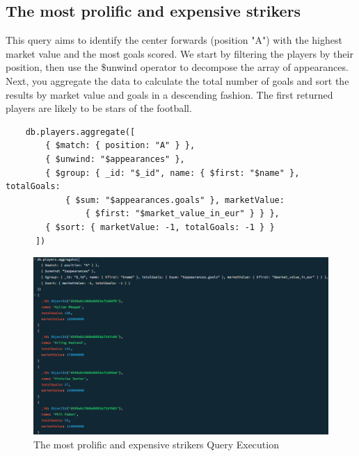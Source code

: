 \documentclass{Configuration_Files/PoliMi3i_thesis}
\begin{document}
\subsection{The most prolific and expensive strikers}
This query aims to identify the center forwards (position "A") with the highest market value and the most goals scored. We start by filtering the players by their position, then use the \$unwind operator to decompose the array of appearances. Next, you aggregate the data to calculate the total number of goals and sort the results by market value and goals in a descending fashion. The first returned players are likely to be stars of the football. 
\begin{verbatim}
    db.players.aggregate([
        { $match: { position: "A" } },
        { $unwind: "$appearances" },
        { $group: { _id: "$_id", name: { $first: "$name" }, totalGoals: 
            { $sum: "$appearances.goals" }, marketValue: 
                { $first: "$market_value_in_eur" } } },
        { $sort: { marketValue: -1, totalGoals: -1 } }
      ])      
\end{verbatim}
\begin{figure}[htbp]
    \centering
    \includegraphics[scale=0.7]{Images/Queries/Prolific_expensive_strikers/pes.png}
    \caption{The most prolific and expensive strikers Query Execution}
\end{figure}
\end{document}
